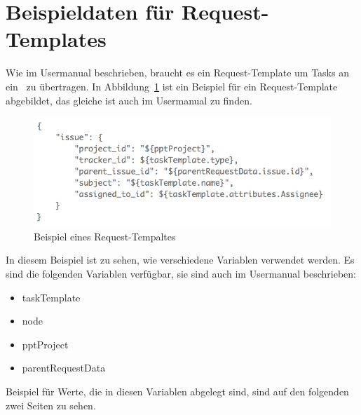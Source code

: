 

\section{Beispieldaten für Request-Templates}
	Wie im Usermanual beschrieben, braucht es ein Request-Template um Tasks an ein \ppt\ zu übertragen.
	In Abbildung~\ref{fig:exampleRequestTemplate} ist ein Beispiel für ein Request-Template abgebildet, das gleiche ist auch im Usermanual zu finden.
	\begin{figure}[H]
		\includegraphics[scale=0.75]{tutorial/img/requesttemplateExample.png}
		\centering
		\caption{Beispiel eines Request-Tempaltes}
		\label{fig:exampleRequestTemplate}
	\end{figure}
	In diesem Beispiel ist zu sehen, wie verschiedene Variablen verwendet werden.
	Es sind die folgenden Variablen verfügbar, sie sind auch im Usermanual beschrieben:
	\begin{itemize}
		\item taskTemplate
		\item node
		\item pptProject
		\item parentRequestData
	\end{itemize}
	Beispiel für Werte, die in diesen Variablen abgelegt sind, sind auf den folgenden zwei Seiten zu sehen.

	

